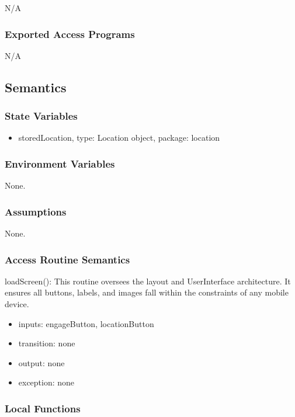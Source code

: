 N/A

\subsubsection{Exported Access Programs}

N/A

\subsection{Semantics}

\subsubsection{State Variables}

\begin{itemize}
\item storedLocation, type: Location object, package: location
\end{itemize}


\subsubsection{Environment Variables}

None.


\subsubsection{Assumptions}

None.

\subsubsection{Access Routine Semantics}

\noindent loadScreen():
This routine oversees the layout and UserInterface architecture. It ensures all buttons, labels, and images fall within the constraints of any mobile device. 
\begin{itemize}
\item inputs: engageButton, locationButton
\item transition: none
\item output: none
\item exception: none
\end{itemize}

\subsubsection{Local Functions}

